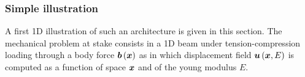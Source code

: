 %     

\subsubsection{Simple illustration}
\label{1D_NeuROM}
A first 1D illustration of such an architecture is given in this section. The mechanical problem at stake consists in a 1D beam under tension-compression loading through a body force $\boldsymbol{b}\left(\boldsymbol{x}\right)$ as in \parencite{zhang_hierarchical_2021} which displacement field $\boldsymbol{u}\left(\boldsymbol{x},E\right)$ is computed as a function of space $\boldsymbol{x}$ and of the young modulus $E$.

